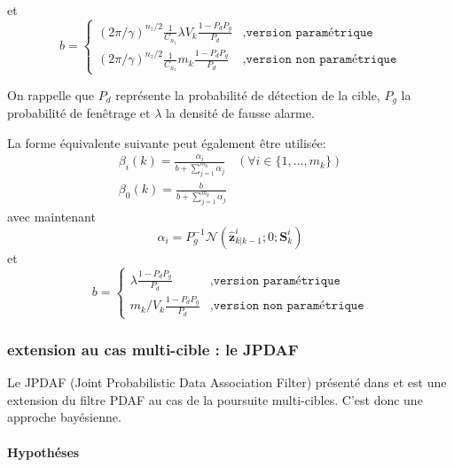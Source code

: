\documentclass[10pt,french,a4paper]{report}
\begin{document}
	et
	 \begin{equation}
	b= \left\{ \begin{aligned}
	 (2\pi/\gamma)^{n_z/2}\frac{1}{C_{n_z}} \lambda V_k \frac{1-P_dP_g}{P_d} &,\texttt{version paramétrique} \\
	 (2\pi/\gamma)^{n_z/2}\frac{1}{C_{n_z}} m_k \frac{1-P_dP_g}{P_d}  &, \texttt{version non paramétrique} 
	\end{aligned} \right.
	\end{equation}
	
	On rappelle que $P_d$ représente la probabilité de détection de la cible, $P_g$ la probabilité de fenêtrage et $\lambda$ la densité de fausse alarme.
	
	La forme équivalente suivante peut également être utilisée:
	 \begin{equation}
	 \begin{aligned}
	 \beta_i(k) = \frac{\alpha_i}{b+\sum_{j=1}^{m_k}\alpha_j} & (\forall i \in \{1,\ldots,m_k\})\\
	  \beta_0( k) = \frac{b}{b+\sum_{j=1}^{m_k}\alpha_j}& 
	\end{aligned} 
	\end{equation}
	avec maintenant
	 \begin{equation}
	 \alpha_i = P_g^{-1}\mathcal{N}(\hat{\mathbf{z}}_{k|k-1}^i;0;\mathbf{S}_k^i)
	\end{equation}
	et
	 \begin{equation}
	b= \left\{ \begin{aligned}
	  \lambda  \frac{1-P_dP_g}{P_d} &,\texttt{version paramétrique} \\
	   m_k/V_k \frac{1-P_dP_g}{P_d}  &, \texttt{version non paramétrique} 
	\end{aligned} \right.
	\end{equation}
	
	
									\subsubsection{extension au cas multi-cible : le JPDAF}
									\label{Section::hypothesesCumulees}
									
									Le \ac{JPDAF} (Joint Probabilistic Data Association Filter)  présenté dans \cite{BarShalom1995} et \cite{BarShalom2009} est une extension du filtre PDAF au cas de la poursuite multi-cibles. C'est donc une approche bayésienne.
									
									\paragraph{Hypothéses}
									
\end{document}
